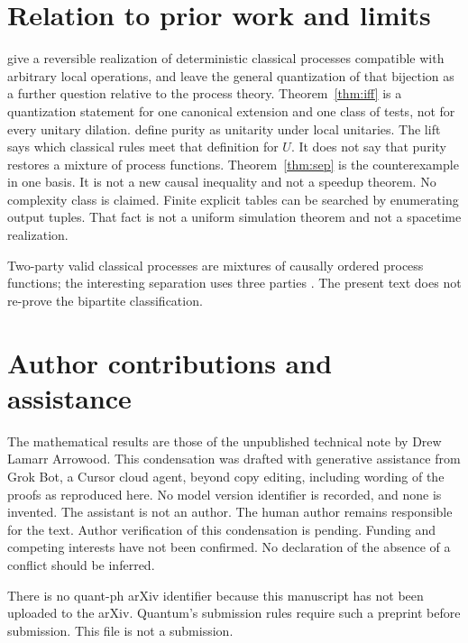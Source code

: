\documentclass[11pt]{article}
\theoremstyle{definition}
\begin{document}
\section{Relation to prior work and limits}
\label{sec:prior}
\citet{baumeler2019} give a reversible realization of deterministic classical processes compatible with arbitrary local operations, and leave the general quantization of that bijection as a further question relative to the process theory. Theorem~\ref{thm:iff} is a quantization statement for one canonical extension and one class of tests, not for every unitary dilation. \citet{araujo2017} define purity as unitarity under local unitaries. The lift says which classical rules meet that definition for \(U\). It does not say that purity restores a mixture of process functions. Theorem~\ref{thm:sep} is the counterexample in one basis. It is not a new causal inequality and not a speedup theorem. No complexity class is claimed. Finite explicit tables can be searched by enumerating output tuples. That fact is not a uniform simulation theorem and not a spacetime realization.

Two-party valid classical processes are mixtures of causally ordered process functions; the interesting separation uses three parties \cite{oreshkov2012}. The present text does not re-prove the bipartite classification.

\section*{Author contributions and assistance}
The mathematical results are those of the unpublished technical note by Drew Lamarr Arrowood. This condensation was drafted with generative assistance from Grok Bot, a Cursor cloud agent, beyond copy editing, including wording of the proofs as reproduced here. No model version identifier is recorded, and none is invented. The assistant is not an author. The human author remains responsible for the text. Author verification of this condensation is pending. Funding and competing interests have not been confirmed. No declaration of the absence of a conflict should be inferred.

There is no quant-ph arXiv identifier because this manuscript has not been uploaded to the arXiv. Quantum's submission rules require such a preprint before submission. This file is not a submission.



\end{document}
